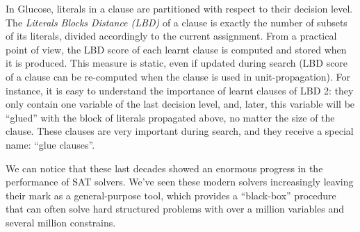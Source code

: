 In Glucose, literals in a clause are partitioned with respect to their decision
level. The \emph{Literals Blocks Distance (LBD)} of a clause is exactly the
number of subsets of its literals, divided accordingly to the current
assignment. From a practical point of view, the LBD score of each learnt clause
is computed and stored when it is produced. This measure is static, even if
updated during search (LBD score of a clause can be re-computed when the clause
is used in unit-propagation). For instance, it is easy to understand the
importance of learnt clauses of LBD 2: they only contain one variable of the
last decision level, and, later, this variable will be ``glued'' with the block
of literals propagated above, no matter the size of the clause. These clauses
are very important during search, and they receive a special name: ``glue
clauses''.

We can notice that these last decades showed an enormous progress in the
performance of SAT solvers. We've seen these modern solvers increasingly leaving
their mark as a general-purpose tool, which provides a ``black-box'' procedure
that can often solve hard structured problems with over a million variables and
several million constrains. 
